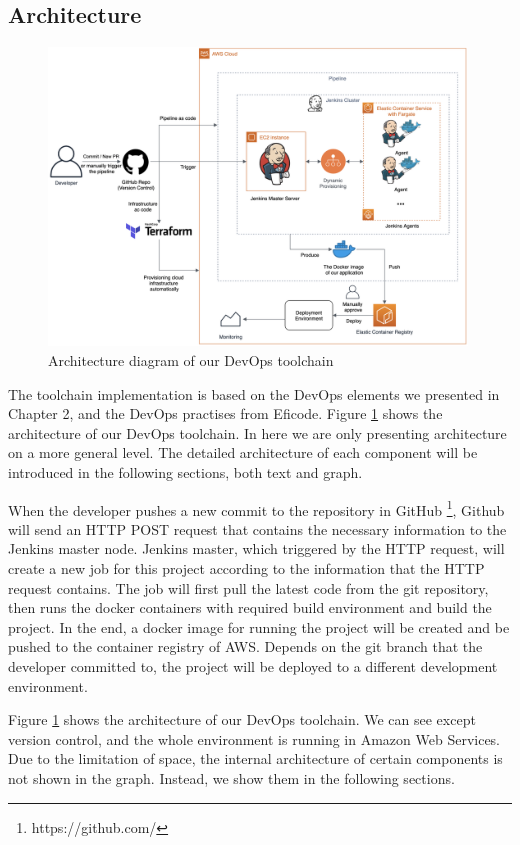 \subsection{Architecture}
\begin{figure}[!htbp]
\centering
\includegraphics[width=0.99\textwidth]{pics/arch-med-jenkins.png}
\caption{Architecture diagram of our DevOps toolchain}
\label{fig:archjenkins}
\end{figure}
The toolchain implementation is based on the DevOps elements we presented in Chapter 2, and the DevOps practises from Eficode. Figure \ref{fig:archjenkins} shows the architecture of our DevOps toolchain. In here we are only presenting architecture on a more general level. The detailed architecture of each component will be introduced in the following sections, both text and graph.
\par
When the developer pushes a new commit to the repository in GitHub \footnote{https://github.com/}, Github will send an HTTP POST request that contains the necessary information to the Jenkins master node. Jenkins master, which triggered by the HTTP request, will create a new job for this project according to the information that the HTTP request contains. The job will first pull the latest code from the git repository, then runs the docker containers with required build environment and build the project. In the end, a docker image for running the project will be created and be pushed to the container registry of AWS. Depends on the git branch that the developer committed to, the project will be deployed to a different development environment.
\par
Figure \ref{fig:archjenkins} shows the architecture of our DevOps toolchain. We can see except version control, and the whole environment is running in Amazon Web Services. Due to the limitation of space, the internal architecture of certain components is not shown in the graph. Instead, we show them in the following sections.
